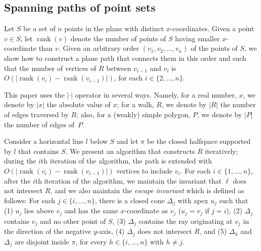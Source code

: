 \documentclass{patmorin}
\DeclareMathOperator{\rank}{rank}
\begin{document}
\subsection{Spanning paths of point sets}
Let $S$ be a set of $n$ points in the plane with distinct $x$-coordinates.
Given a point $v\in S$, let $\rank(v)$ denote the number of points of $S$ having smaller $x$-coordinate than $v$.
Given an arbitrary order $(v_1, v_2, \ldots, v_n)$ of the points of $S$, we show how to construct a plane path that connects them in this order and such that the number of vertices of $R$ between $v_{i-1}$ and $v_{i}$ is $O(|\rank(v_i) - \rank(v_{i-1})|)$, for each $i\in \{2, \dots, n\}$.

This paper uses the $|\cdot|$ operator in several ways.  Namely, for a real number, $x$, we denote by $|x|$ the absolute value of $x$; for a walk, $R$, we denote by $|R|$ the number of edges traversed by $R$; also, for a (weakly) simple polygon, $P$, we denote by $|P|$ the number of edges of~$P$.

Consider a horizontal line $l$ below $S$ and let $\pi$ be the closed halfspace supported by $l$ that contains $S$.  We present an algorithm that constructs $R$ iteratively; during the $i$th iteration of the algorithm, the path is extended with $O(|\rank(v_i) - \rank(v_{i-1})|)$ vertices to include $v_i$.  For each $i\in \{1,\dots,n\}$, after the $i$th iteration of the algorithm, we maintain the invariant that $\ell$ does not intersect $R$, and we also maintain the \emph{escape invariant} which is defined as follows:
For each $j\in \{i, \dots, n\}$, there is a closed cone $\Delta_{j}$ with apex $u_{j}$ such that (1) $u_j$ lies above $v_j$ and has the same $x$-coordinate as $v_j$ ($u_j =v_j$ if $j = i$), (2) $\Delta_j$ contains $v_j$ and no other point of $S$, (3) $\Delta_j$ contains the ray originating at $v_j$ in the direction of the negative $y$-axis, (4) $\Delta_j$ does not intersect $R$, and (5) $\Delta_h$ and $\Delta_j$ are disjoint inside $\pi$, for every $h\in \{i,\dots,n\}$ with $h\neq j$.

\end{document}
